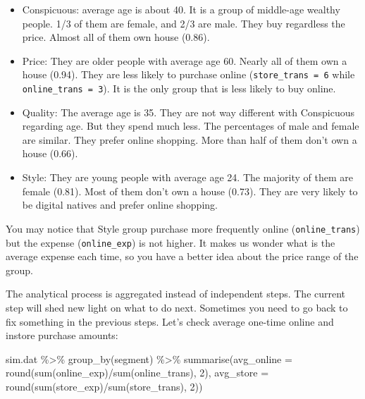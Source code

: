\documentclass[
  12pt,
]{krantz}
\makeatletter
\newenvironment{Shaded}{\begin{snugshade}}{\end{snugshade}}
\newcommand{\AttributeTok}[1]{\textcolor[rgb]{0.61,0.61,0.61}{#1}}
\newcommand{\DecValTok}[1]{\textcolor[rgb]{0.06,0.06,0.06}{#1}}
\newcommand{\FunctionTok}[1]{\textcolor[rgb]{0,0,0}{#1}}
\newcommand{\NormalTok}[1]{#1}
\newcommand{\SpecialCharTok}[1]{\textcolor[rgb]{0,0,0}{#1}}
\newenvironment{kframe}{%
\medskip{}
\setlength{\fboxsep}{.8em}
 \def\at@end@of@kframe{}%
 \ifinner\ifhmode%
  \def\at@end@of@kframe{\end{minipage}}%
  \begin{minipage}{\columnwidth}%
 \fi\fi%
 \def\FrameCommand##1{\hskip\@totalleftmargin \hskip-\fboxsep
 \colorbox{shadecolor}{##1}\hskip-\fboxsep
     \hskip-\linewidth \hskip-\@totalleftmargin \hskip\columnwidth}%
 \MakeFramed {\advance\hsize-\width
   \@totalleftmargin\z@ \linewidth\hsize
   \@setminipage}}%
 {\par\unskip\endMakeFramed%
 \at@end@of@kframe}
\renewenvironment{Shaded}{\begin{kframe}}{\end{kframe}}
\makeatother
\begin{document}
\begin{itemize}
\item
  Conspicuous: average age is about 40. It is a group of middle-age wealthy people. 1/3 of them are female, and 2/3 are male. They buy regardless the price. Almost all of them own house (0.86).
\item
  Price: They are older people with average age 60. Nearly all of them own a house (0.94). They are less likely to purchase online (\texttt{store\_trans\ =\ 6} while \texttt{online\_trans\ =\ 3}). It is the only group that is less likely to buy online.
\item
  Quality: The average age is 35. They are not way different with Conspicuous regarding age. But they spend much less. The percentages of male and female are similar. They prefer online shopping. More than half of them don't own a house (0.66).
\item
  Style: They are young people with average age 24. The majority of them are female (0.81). Most of them don't own a house (0.73). They are very likely to be digital natives and prefer online shopping.
\end{itemize}

You may notice that Style group purchase more frequently online (\texttt{online\_trans}) but the expense (\texttt{online\_exp}) is not higher. It makes us wonder what is the average expense each time, so you have a better idea about the price range of the group.

The analytical process is aggregated instead of independent steps. The current step will shed new light on what to do next. Sometimes you need to go back to fix something in the previous steps. Let's check average one-time online and instore purchase amounts:

\begin{Shaded}
\begin{Highlighting}[]
\NormalTok{sim.dat }\SpecialCharTok{\%\textgreater{}\%} 
  \FunctionTok{group\_by}\NormalTok{(segment) }\SpecialCharTok{\%\textgreater{}\%} 
  \FunctionTok{summarise}\NormalTok{(}\AttributeTok{avg\_online =} \FunctionTok{round}\NormalTok{(}\FunctionTok{sum}\NormalTok{(online\_exp)}\SpecialCharTok{/}\FunctionTok{sum}\NormalTok{(online\_trans), }\DecValTok{2}\NormalTok{),}
            \AttributeTok{avg\_store =} \FunctionTok{round}\NormalTok{(}\FunctionTok{sum}\NormalTok{(store\_exp)}\SpecialCharTok{/}\FunctionTok{sum}\NormalTok{(store\_trans), }\DecValTok{2}\NormalTok{))}
\end{Highlighting}
\end{Shaded}
\end{document}
